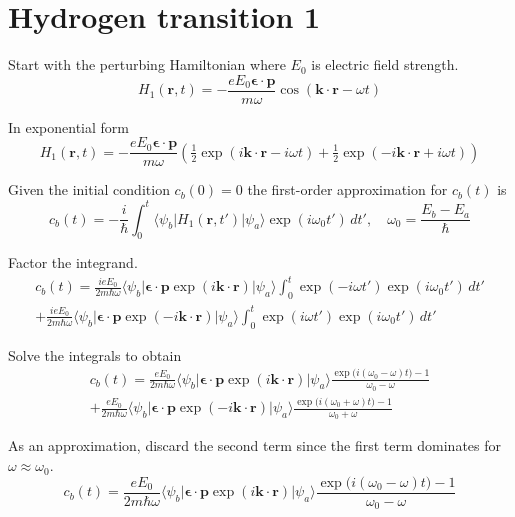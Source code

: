 

\section*{Hydrogen transition 1}

Start with the perturbing Hamiltonian where $E_0$ is electric field strength.
\begin{equation*}
H_1(\mathbf r,t)=-\frac{eE_0\boldsymbol{\epsilon}\cdot\mathbf p}{m\omega}
\cos(\mathbf k\cdot\mathbf r-\omega t)
\end{equation*}

In exponential form
\begin{equation*}
H_1(\mathbf r,t)=-\frac{eE_0\boldsymbol{\epsilon}\cdot\mathbf p}{m\omega}
\left(\tfrac{1}{2}\exp(i\mathbf k\cdot\mathbf r-i\omega t)
+\tfrac{1}{2}\exp(-i\mathbf k\cdot\mathbf r+i\omega t)\right)
\end{equation*}

Given the initial condition $c_b(0)=0$ the first-order approximation for $c_b(t)$ is
\begin{equation*}
c_b(t)=-\frac{i}{\hbar}\int_0^t
\langle\psi_b|H_1(\mathbf r,t')|\psi_a\rangle\exp(i\omega_0t')\,dt',\quad
\omega_0=\frac{E_b-E_a}{\hbar}
\end{equation*}

Factor the integrand.
\begin{multline*}
c_b(t)
=\frac{ieE_0}{2m\hbar\omega}
\langle\psi_b|\boldsymbol{\epsilon}\cdot\mathbf p\exp(i\mathbf k\cdot\mathbf r)|\psi_a\rangle
\int_0^t\exp(-i\omega t')\exp(i\omega_0t')\,dt'
\\
+\frac{ieE_0}{2m\hbar\omega}
\langle\psi_b|\boldsymbol{\epsilon}\cdot\mathbf p\exp(-i\mathbf k\cdot\mathbf r)|\psi_a\rangle
\int_0^t\exp(i\omega t')\exp(i\omega_0t')\,dt'
\end{multline*}

Solve the integrals to obtain
\begin{multline*}
c_b(t)=\frac{eE_0}{2m\hbar\omega}
\langle\psi_b|\boldsymbol{\epsilon}\cdot\mathbf p\exp(i\mathbf k\cdot\mathbf r)|\psi_a\rangle
\frac{\exp\bigl(i(\omega_0-\omega)t\bigr)-1}{\omega_0-\omega}
\\
+\frac{eE_0}{2m\hbar\omega}
\langle\psi_b|\boldsymbol{\epsilon}\cdot\mathbf p\exp(-i\mathbf k\cdot\mathbf r)|\psi_a\rangle
\frac{\exp\bigl(i(\omega_0+\omega)t\bigr)-1}{\omega_0+\omega}
\tag{1}
\end{multline*}

As an approximation, discard the second term since the first term
dominates for $\omega\approx\omega_0$.
\begin{equation*}
c_b(t)=\frac{eE_0}{2m\hbar\omega}
\langle\psi_b|\boldsymbol{\epsilon}\cdot\mathbf p\exp(i\mathbf k\cdot\mathbf r)|\psi_a\rangle
\frac{\exp\bigl(i(\omega_0-\omega)t\bigr)-1}{\omega_0-\omega}
\end{equation*}

